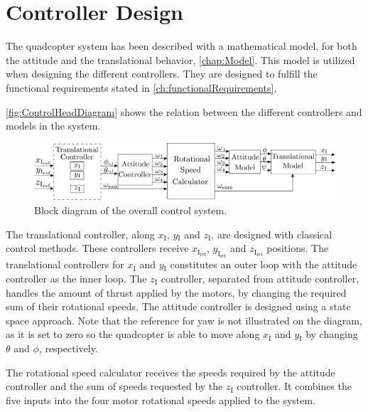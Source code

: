 \chapter{Controller Design}\label{chap:Control}
The quadcopter system has been described with a mathematical model, for both the attitude and the translational behavior, \autoref{chap:Model}. This model is utilized when designing the different controllers. They are designed to fulfill the functional requirements stated in \autoref{ch:functionalRequirements}.

\autoref{fig:ControlHeadDiagram} shows the relation between the different controllers and models in the system.

%
\begin{figure}[H]
	\centering
	\includegraphics[width=1 \textwidth]{figures/generalcontroldiagram2}
	\caption{Block diagram of the overall control system.}
	\label{fig:ControlHeadDiagram}
\end{figure}
%
The translational controller, along $x_{\mathrm{I}}$, $y\mathrm{_I}$ and $z\mathrm{_I}$, are designed with classical control methods. These controllers receive $x_\mathrm{I_{ref}}$, $y_\mathrm{I_{ref}}$ and $z_\mathrm{I_{ref}}$ positions. The translational controllers for $x\mathrm{_I}$ and $y\mathrm{_I}$ constitutes an outer loop with the attitude controller as the inner loop. The $z\mathrm{_I}$ controller, separated from attitude controller, handles the amount of thrust applied by the motors, by changing the required sum of their rotational speeds. The attitude controller is designed using a state space approach. Note that the reference for yaw is not illustrated on the diagram, as it is set to zero so the quadcopter is able to move along $x_{\mathrm{I}}$ and $y\mathrm{_I}$ by changing $\theta$ and $\phi$, respectively.

The rotational speed calculator receives the speeds required by the attitude controller and the sum of speeds requested by the $z\mathrm{_I}$ controller. It combines the five inputs into the four motor rotational speeds applied to the system.

